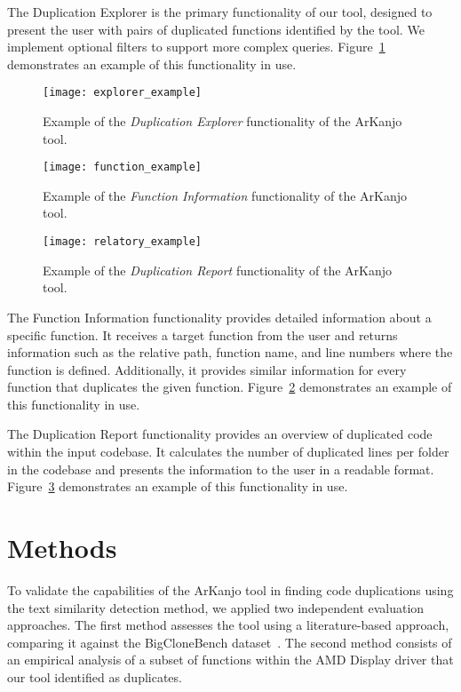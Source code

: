 \documentclass[conference]{IEEEtran}
\begin{document}
The Duplication Explorer is the primary functionality of our tool, designed to present
the user with pairs of duplicated functions identified by the tool. We implement optional
filters to support more complex queries. Figure~\ref{fig:explorer_ex} demonstrates an
example of this functionality in use.

\begin{figure}[!t]
\centering
\texttt{[image: explorer\_example]}
\caption{Example of the \textit{Duplication Explorer} functionality of the ArKanjo tool.}
\label{fig:explorer_ex}
\end{figure}

\begin{figure}[!t]
\centering
\texttt{[image: function\_example]}
\caption{Example of the \textit{Function Information} functionality of the ArKanjo tool.}
\label{fig:function_ex}
\end{figure}

\begin{figure}[!t]
\centering
\texttt{[image: relatory\_example]}
\caption{Example of the \textit{Duplication Report} functionality of the ArKanjo tool.}
\label{fig:relatory_ex}
\end{figure}

The Function Information functionality provides detailed information about a specific function. 
It receives a target function from the user
and returns information such as the relative path, function name, and line numbers where
the function is defined. Additionally, it provides similar information for every function
that duplicates the given function. Figure~\ref{fig:function_ex} demonstrates an
example of this functionality in use.

The Duplication Report functionality provides an overview of
duplicated code within the input codebase. It calculates the number of
duplicated lines per folder in the codebase and presents the information to the user in
a readable format. Figure~\ref{fig:relatory_ex} demonstrates an example of this functionality in use.



\section{Methods}

To validate the capabilities of the ArKanjo tool in finding code duplications using the 
text similarity detection method, we applied two independent
evaluation approaches. The first method assesses the tool using a literature-based approach,
comparing it against the BigCloneBench dataset~\cite{bigclonebench}. The second
method consists of an empirical analysis of a subset of functions within the AMD Display driver
that our tool identified as duplicates. 
\end{document}

